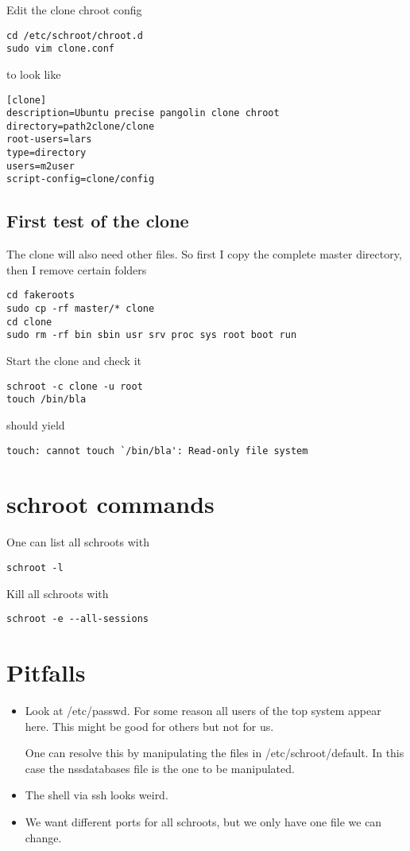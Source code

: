 \documentclass[a4paper]{article}
\begin{document}
Edit the clone chroot config

\begin{verbatim}
cd /etc/schroot/chroot.d
sudo vim clone.conf
\end{verbatim}

to look like

\begin{verbatim}
[clone]
description=Ubuntu precise pangolin clone chroot
directory=path2clone/clone
root-users=lars
type=directory
users=m2user
script-config=clone/config
\end{verbatim}

\subsection{First test of the clone}

The clone will also need other files. So first I copy the complete master directory, then I remove certain folders

\begin{verbatim}
cd fakeroots
sudo cp -rf master/* clone
cd clone
sudo rm -rf bin sbin usr srv proc sys root boot run
\end{verbatim}

Start the clone and check it

\begin{verbatim}
schroot -c clone -u root
touch /bin/bla
\end{verbatim}

should yield

\begin{verbatim}
touch: cannot touch `/bin/bla': Read-only file system
\end{verbatim}

\section{schroot commands}
One can list all schroots with

\begin{verbatim}
schroot -l
\end{verbatim}

Kill all schroots with

\begin{verbatim}
schroot -e --all-sessions
\end{verbatim}

\section{Pitfalls}
\begin{itemize}
\item Look at /etc/passwd. For some reason all users of the top system appear here. This might be good for others but not for us.

One can resolve this by manipulating the files in /etc/schroot/default. In this case the nssdatabases file is the one to be manipulated.
\item The shell via ssh looks weird.
\item We want different ports for all schroots, but we only have one file we can change.
\end{itemize}
\end{document}
